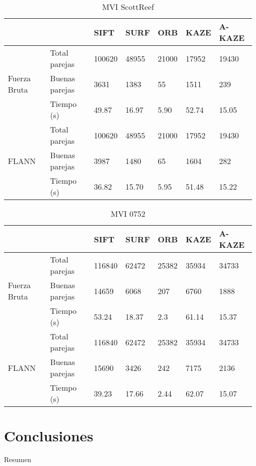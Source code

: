 \begin{table}[]
	\centering
	\caption{MVI ScottReef}
	\label{my-label}
	\begin{tabular}{@{}lllllll@{}}
		\toprule
		   &                				& SIFT & SURF & ORB & KAZE & A-KAZE \\ \midrule 
			   \hfill\vline& Total parejas  &100620&48955 &21000&17952 & 19430  \\
		Fuerza Bruta \vline& Buenas parejas & 3631 & 1383 & 55  & 1511 & 239    \\
		\vspace{0.5cm}
			   \hfill\vline& Tiempo (s)     & 49.87& 16.97&5.90 &52.74 & 15.05 \\
			   
			   \hfill\vline& Total parejas  &100620&48955 &21000&17952 & 19430  \\
		FLANN  \hfill\vline& Buenas parejas &3987  & 1480 & 65  & 1604 &282     \\ 
			   \hfill\vline& Tiempo (s)     & 36.82& 15.70& 5.95& 51.48& 15.22  \\ 
		\bottomrule
	\end{tabular}
\end{table}


\begin{table}[]
	\centering
	\caption{MVI 0752}
	\label{my-label}
	\begin{tabular}{@{}lllllll@{}}
		\toprule
		&                      				& SIFT & SURF & ORB & KAZE & A-KAZE  \\ \midrule 
			   \hfill\vline& Total parejas  &116840& 62472&25382&35934 & 34733   \\
		Fuerza Bruta \vline& Buenas parejas & 14659& 6068 & 207 & 6760 & 1888    \\
		\vspace{0.5cm}
			   \hfill\vline& Tiempo (s)     & 53.24&18.37 & 2.3 &61.14 & 15.37   \\
			   
			   \hfill\vline& Total parejas  &116840& 62472&25382&35934 & 34733   \\
		FLANN  \hfill\vline& Buenas parejas &15690 & 3426 & 242 & 7175 & 2136    \\ 
			   \hfill\vline& Tiempo (s)     & 39.23& 17.66& 2.44& 62.07& 15.07   \\ 
		\bottomrule
	\end{tabular}
\end{table}


\section{Conclusiones}

Resumen